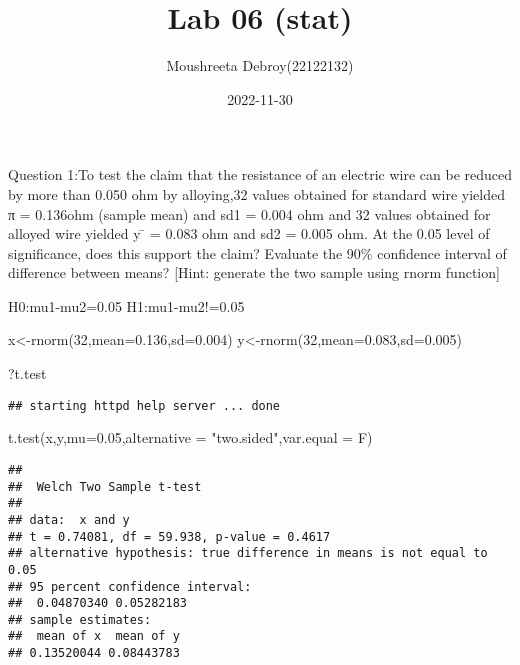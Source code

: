\documentclass[
]{article}
\title{Lab 06 (stat)}
\author{Moushreeta Debroy(22122132)}
\date{2022-11-30}
\newenvironment{Shaded}{\begin{snugshade}}{\end{snugshade}}
\newcommand{\AttributeTok}[1]{\textcolor[rgb]{0.77,0.63,0.00}{#1}}
\newcommand{\DecValTok}[1]{\textcolor[rgb]{0.00,0.00,0.81}{#1}}
\newcommand{\FloatTok}[1]{\textcolor[rgb]{0.00,0.00,0.81}{#1}}
\newcommand{\FunctionTok}[1]{\textcolor[rgb]{0.00,0.00,0.00}{#1}}
\newcommand{\NormalTok}[1]{#1}
\newcommand{\OtherTok}[1]{\textcolor[rgb]{0.56,0.35,0.01}{#1}}
\newcommand{\StringTok}[1]{\textcolor[rgb]{0.31,0.60,0.02}{#1}}
\begin{document}
\maketitle

Question 1:To test the claim that the resistance of an electric wire can
be reduced by more than 0.050 ohm by alloying,32 values obtained for
standard wire yielded π = 0.136ohm (sample mean) and sd1 = 0.004 ohm and
32 values obtained for alloyed wire yielded y ̄ = 0.083 ohm and sd2 =
0.005 ohm. At the 0.05 level of significance, does this support the
claim? Evaluate the 90\% confidence interval of difference between
means? {[}Hint: generate the two sample using rnorm function{]}

H0:mu1-mu2=0.05 H1:mu1-mu2!=0.05

\begin{Shaded}
\begin{Highlighting}[]
\NormalTok{x}\OtherTok{\textless{}{-}}\FunctionTok{rnorm}\NormalTok{(}\DecValTok{32}\NormalTok{,}\AttributeTok{mean=}\FloatTok{0.136}\NormalTok{,}\AttributeTok{sd=}\FloatTok{0.004}\NormalTok{)}
\NormalTok{y}\OtherTok{\textless{}{-}}\FunctionTok{rnorm}\NormalTok{(}\DecValTok{32}\NormalTok{,}\AttributeTok{mean=}\FloatTok{0.083}\NormalTok{,}\AttributeTok{sd=}\FloatTok{0.005}\NormalTok{)}
\end{Highlighting}
\end{Shaded}

\begin{Shaded}
\begin{Highlighting}[]
\NormalTok{?t.test}
\end{Highlighting}
\end{Shaded}

\begin{verbatim}
## starting httpd help server ... done
\end{verbatim}

\begin{Shaded}
\begin{Highlighting}[]
\FunctionTok{t.test}\NormalTok{(x,y,}\AttributeTok{mu=}\FloatTok{0.05}\NormalTok{,}\AttributeTok{alternative =} \StringTok{"two.sided"}\NormalTok{,}\AttributeTok{var.equal =}\NormalTok{ F)}
\end{Highlighting}
\end{Shaded}

\begin{verbatim}
## 
##  Welch Two Sample t-test
## 
## data:  x and y
## t = 0.74081, df = 59.938, p-value = 0.4617
## alternative hypothesis: true difference in means is not equal to 0.05
## 95 percent confidence interval:
##  0.04870340 0.05282183
## sample estimates:
##  mean of x  mean of y 
## 0.13520044 0.08443783
\end{verbatim}
\end{document}

